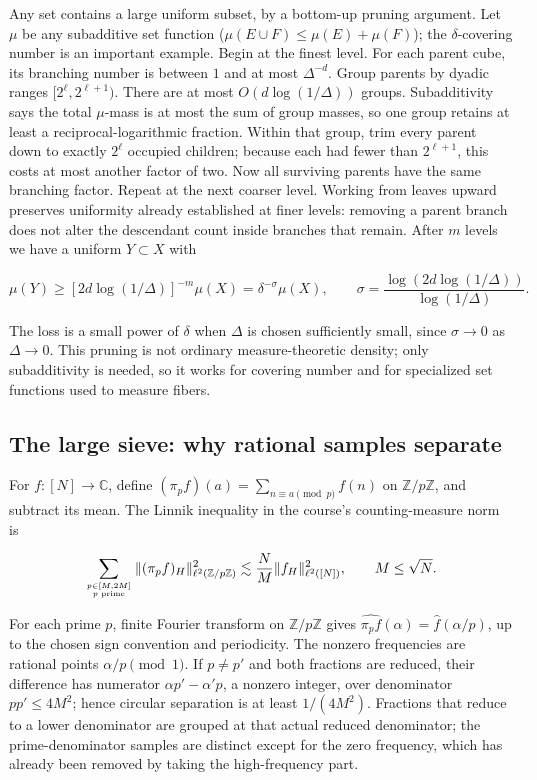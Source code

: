 Any set contains a large uniform subset, by a bottom-up pruning argument. Let \(\mu\) be any subadditive set function (\(\mu(E\cup F)\le\mu(E)+\mu(F)\)); the \(\delta\)-covering number is an important example. Begin at the finest level. For each parent cube, its branching number is between \(1\) and at most \(\Delta^{-d}\). Group parents by dyadic ranges \([2^\ell,2^{\ell+1})\). There are at most \(O(d\log(1/\Delta))\) groups. Subadditivity says the total \(\mu\)-mass is at most the sum of group masses, so one group retains at least a reciprocal-logarithmic fraction. Within that group, trim every parent down to exactly \(2^\ell\) occupied children; because each had fewer than \(2^{\ell+1}\), this costs at most another factor of two. Now all surviving parents have the same branching factor. Repeat at the next coarser level. Working from leaves upward preserves uniformity already established at finer levels: removing a parent branch does not alter the descendant count inside branches that remain. After \(m\) levels we have a uniform \(Y\subset X\) with

\[\mu(Y)\ge [2d\log(1/\Delta)]^{-m}\mu(X)=\delta^{-\sigma}\mu(X),\qquad \sigma=\frac{\log(2d\log(1/\Delta))}{\log(1/\Delta)}.\]

The loss is a small power of \(\delta\) when \(\Delta\) is chosen sufficiently small, since \(\sigma\to0\) as \(\Delta\to0\). This pruning is not ordinary measure-theoretic density; only subadditivity is needed, so it works for covering number and for specialized set functions used to measure fibers.

\subsection{The large sieve: why rational samples separate}\label{04-visual-computing-ii-ch033-the-large-sieve-why-rational-samples-separate}

\hypertarget{04-visual-computing-ii-ch033-the-large-sieve-why-rational-samples-separate}{}

For \(f:[N]\to\mathbb C\), define \((\pi_pf)(a)=\sum_{n\equiv a\pmod p}f(n)\) on \(\mathbb Z/p\mathbb Z\), and subtract its mean. The Linnik inequality in the course's counting-measure norm is

\[\sum_{p\in[M,2M]\atop p\text{ prime}}\|(\pi_pf)_H\|_{\ell^2(\mathbb Z/p\mathbb Z)}^2\lesssim \frac{N}{M}\|f_H\|_{\ell^2([N])}^2,\qquad M\le\sqrt N.\]

For each prime \(p\), finite Fourier transform on \(\mathbb Z/p\mathbb Z\) gives \(\widehat{\pi_pf}(\alpha)=\widehat f(\alpha/p)\), up to the chosen sign convention and periodicity. The nonzero frequencies are rational points \(\alpha/p\pmod1\). If \(p\ne p'\) and both fractions are reduced, their difference has numerator \(\alpha p'-\alpha'p\), a nonzero integer, over denominator \(pp'\le4M^2\); hence circular separation is at least \(1/(4M^2)\). Fractions that reduce to a lower denominator are grouped at that actual reduced denominator; the prime-denominator samples are distinct except for the zero frequency, which has already been removed by taking the high-frequency part.

